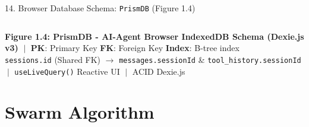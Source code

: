 \documentclass[aspectratio=169,10pt]{beamer}
\begin{document}
\begin{frame}[t]{14. Browser Database Schema: \texttt{PrismDB} (Figure 1.4)}
\begin{columns}[T, totalwidth=\linewidth]
\end{columns}


\vspace{0.08cm}
\begin{tcolorbox}[
  enhanced, arc=3pt, colframe=lavenderDark!60, colback=lavenderLight!30,
  boxrule=0.50pt, left=5pt, right=5pt, top=2pt, bottom=2pt
]
\centering\fontsize{4.6}{5.6}\selectfont\color{lavenderDark}
\textbf{Figure 1.4: PrismDB - AI-Agent Browser IndexedDB Schema (Dexie.js v3)} $\;\vert\;$
\textbf{PK}: Primary Key \enspace \textbf{FK}: Foreign Key \enspace \textbf{Index}: B-tree index\\[1pt]
\texttt{sessions.id} (Shared FK) $\to$ \texttt{messages.sessionId} \& \texttt{tool\_history.sessionId} $\;\vert\;$
\texttt{useLiveQuery()} Reactive UI $\;\vert\;$ ACID Dexie.js
\end{tcolorbox}
\end{frame}

\section{Swarm Algorithm}

\newenvironment{algolist}{%
  \begin{list}{}{%
    \setlength{\labelwidth}{1.9em}%
    \setlength{\leftmargin}{2.1em}%
    \setlength{\itemindent}{0pt}%
    \setlength{\labelsep}{0.45em}%
    \setlength{\itemsep}{0.28em}%
    \setlength{\parsep}{0pt}%
    \setlength{\topsep}{0.1em}%
    \renewcommand{\makelabel}[1]{\textbf{\color{lavenderDark}##1}}%
  }\small%
}{\end{list}}

\newenvironment{algosublist}{%
  \begin{list}{}{%
    \setlength{\labelwidth}{2.4em}%
    \setlength{\leftmargin}{2.8em}%
    \setlength{\itemindent}{0pt}%
    \setlength{\labelsep}{0.4em}%
    \setlength{\itemsep}{0.14em}%
    \setlength{\parsep}{0pt}%
    \setlength{\topsep}{0.1em}%
    \renewcommand{\makelabel}[1]{\textbf{\color{lavenderMedium}##1}}%
  }\small%
}{\end{list}}
\end{document}
